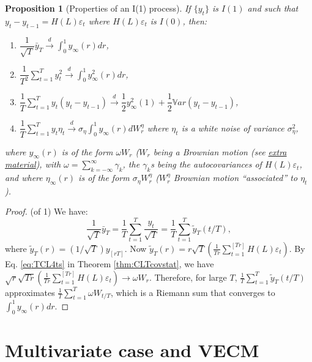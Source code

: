 \documentclass[
  12pt,
]{book}
\providecommand{\tightlist}{%
  \setlength{\itemsep}{0pt}\setlength{\parskip}{0pt}}
\newtheorem{proposition}{Proposition}[chapter]
\theoremstyle{definition}
\theoremstyle{definition}
\theoremstyle{definition}
\theoremstyle{definition}
\theoremstyle{remark}
\begin{document}
\begin{proposition}[Properties of an I(1) process]
\protect\hypertarget{prp:I1process}{}\label{prp:I1process}If \(\{y_t\}\) is \(I(1)\) and such that \(y_t - y_{t-1} = H(L)\varepsilon_t\) where \(H(L)\varepsilon_t\) is \(I(0)\), then:

\begin{enumerate}
\def\labelenumi{\roman{enumi}.}
\tightlist
\item
  \(\dfrac{1}{\sqrt{T}}\bar{y}_T \overset{d}{\rightarrow} \int_{0}^{1}y_{\infty}(r)dr\),
\item
  \(\dfrac{1}{T^2}\sum_{t=1}^T y_t^2 \overset{d}{\rightarrow} \int_{0}^{1}y^2_{\infty}(r)dr\),
\item
  \(\dfrac{1}{T}\sum_{t=1}^T y_t(y_t-y_{t-1}) \overset{d}{\rightarrow} \dfrac{1}{2}y^2_{\infty}(1) + \dfrac{1}{2}\mathbb{V}ar(y_t - y_{t-1})\),
\item
  \(\dfrac{1}{T}\sum_{t=1}^T y_t \eta_t \overset{d}{\rightarrow} \sigma_\eta \int_{0}^{1}y_{\infty}(r)dW_r^{\eta}\) where \(\eta_t\) is a white noise of variance \(\sigma_\eta^2\),
\end{enumerate}

where \(y_{\infty}(r)\) is of the form \(\omega W_r\) (\(W_r\) being a Brownian motion (see \href{https://www.dropbox.com/s/w4qc1c32pzkxngv/Simul_Brownian.pdf?dl=0}{extra material}), with \(\omega = \sum_{k=-\infty}^{\infty} \gamma_k\), the \(\gamma_k\)s being the autocovariances of \(H(L)\varepsilon_t\), and where \(\eta_{\infty}(r)\) is of the form \(\sigma_\eta W^{\eta}_r\) (\(W^{\eta}_r\) Brownian motion ``associated'' to \(\eta_t\)).
\end{proposition}

\begin{proof}
(of 1)
We have:
\[
\dfrac{1}{\sqrt{T}}\bar{y}_T = \frac{1}{T}\sum_{t=1}^{T}\frac{y_{t}}{\sqrt{T}} =  \frac{1}{T}\sum_{t=1}^{T}\tilde{y}_T(t/T),
\]
where \(\tilde{y}_T(r)=(1/\sqrt{T})y_{[rT]}\). Now \(\tilde{y}_T(r) = r \sqrt{T} \left(\frac{1}{Tr}\sum_{t=1}^{[Tr]} H(L)\varepsilon_t\right)\). By Eq. \eqref{eq:TCL4ts} in Theorem \ref{thm:CLTcovstat}, we have \(\sqrt{r}\sqrt{Tr} \left(\frac{1}{Tr}\sum_{t=1}^{[Tr]} H(L)\varepsilon_t\right) \rightarrow \omega W_r\). Therefore, for large \(T\), \(\frac{1}{T}\sum_{t=1}^{T}\tilde{y}_T(t/T)\) approximates \(\frac{1}{T}\sum_{t=1}^{T} \omega W_{t/T}\), which is a Riemann sum that converges to \(\int_{0}^{1}y_{\infty}(r)dr\).
\end{proof}

\hypertarget{multivariate-case-and-vecm}{%
\section{Multivariate case and VECM}\label{multivariate-case-and-vecm}}
\end{document}
